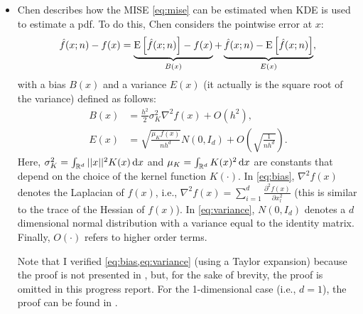 \documentclass[10pt,final,a4paper,oneside,onecolumn]{article}
\newcommand{\expectation}[1]{\textup{E} \left[ #1 \right]}
\begin{document}
\begin{itemize}
\begin{itemize}
		\item Chen \cite{chen2017tutorial} describes how the MISE \cref{eq:mise} can be estimated when KDE is used to estimate a pdf. To do this, Chen considers the pointwise error at $x$:
		\begin{equation} \label{eq:pdf error}
			\hat{f}(x;n) - f(x) = \underbrace{\expectation{\hat{f}(x;n)} - f(x)}_{B(x)} + \underbrace{\hat{f}(x;n) - \expectation{\hat{f}(x;n)}}_{E(x)},
		\end{equation}
		with a bias $B(x)$ and a variance $E(x)$ (it actually is the square root of the variance) defined as follows:
		\begin{align}
			B(x) &= \frac{h^2}{2} \sigma_K^2 \nabla^2 f(x) + O(h^2), \label{eq:bias} \\
			E(x) &= \sqrt{ \frac{\mu_K f(x)}{nh^d} } N(0, I_d) + O\left( \sqrt{\frac{1}{nh^d}} \right). \label{eq:variance}
		\end{align}
		Here, $\sigma_K^2 = \int_{\mathbb{R}^d} ||x||^2 K(x) \, \textup{d}x$ and $\mu_K = \int_{\mathbb{R}^d} K(x)^2 \, \textup{d}x$ are constants that depend on the choice of the kernel function $K(\cdot)$. In \cref{eq:bias}, $\nabla^2 f(x)$ denotes the Laplacian of $f(x)$, i.e., $\nabla^2 f(x) = \sum_{i=1}^d \frac{\partial^2 f(x)}{\partial x_l^2}$ (this is similar to the trace of the Hessian of $f(x)$). In \cref{eq:variance}, $N(0, I_d)$ denotes a $d$ dimensional normal distribution with a variance equal to the identity matrix. Finally, $O(\cdot)$ refers to higher order terms.
		
		Note that I verified \cref{eq:bias,eq:variance} (using a Taylor expansion) because the proof is not presented in \cite{chen2017tutorial}, but, for the sake of brevity, the proof is omitted in this progress report. For the 1-dimensional case (i.e., $d=1$), the proof can be found in \cite{scott1992multivariate}.
		

\end{itemize}
\end{itemize}
\end{document}
